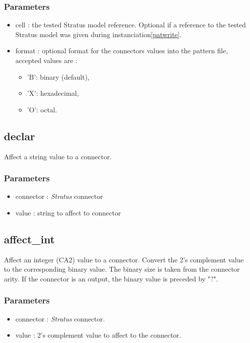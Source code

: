 \documentclass[12pt]{article}
\begin{document}
\subsubsection{Parameters}
\begin{itemize}
\item{cell : the tested Stratus model reference. Optional if a reference to the
tested Stratus model was given during instanciation\ref{patwrite}.}
\item{format : optional format for the connectors values into the pattern file, 
accepted values are :}
   \begin{itemize}
   \item{'B': binary (default),}
   \item{'X': hexadecimal,}
   \item{'O': octal.}
   \end{itemize}
\end{itemize}

\subsection{declar}
\label{declar}
Affect a string value to a connector.

\subsubsection{Parameters}
\begin{itemize}
\item{connector : \emph{Stratus} connector}
\item{value : string to affect to connector}
\end{itemize}

\subsection{affect\_int}
\label{affect_int}
Affect an integer (CA2) value to a connector. Convert the 2's complement value 
to the corresponding binary value. The binary size is taken from the connector 
arity. If the connector is an output, the binary value is preceded by "?".

\subsubsection{Parameters}
\begin{itemize}
\item{connector : \emph{Stratus} connector.}
\item{value : 2's complement value to affect to the connector.}
\end{itemize}
\end{document}
